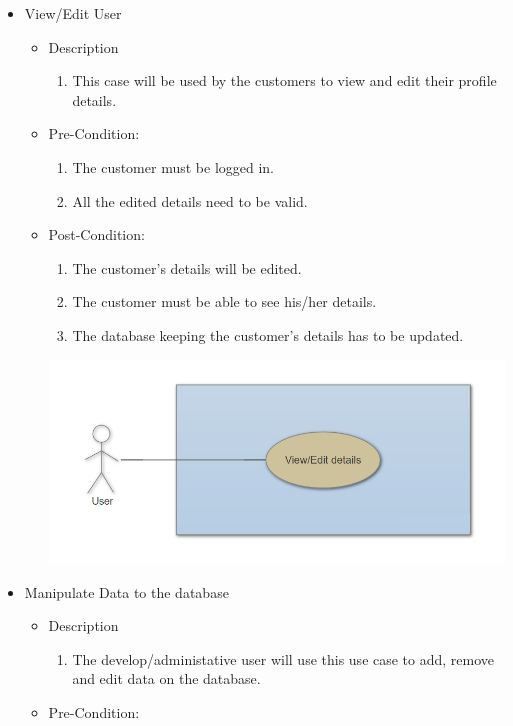 \documentclass[a4paper,10pt]{article}
\begin{document}
\begin{enumerate}
\begin{itemize}
				\item View/Edit User
				\begin{itemize}
					\item Description
						\begin{enumerate}
							\item This case will be used by the customers to view and edit their profile details.
						\end{enumerate}
					\item Pre-Condition:
						\begin{enumerate}	
							\item The customer must be logged in.
							\item All the edited details need to be valid.
						\end{enumerate}
					\item Post-Condition:
						\begin{enumerate}
							\item The customer's details will be edited.
							\item The customer must be able to see his/her details.
							\item The database keeping the customer's details has to be updated.
						\end{enumerate}
	 \includegraphics[scale=0.62]{Diagrams/View_EditUseCase.png}\\
				\end{itemize}
			\item Manipulate Data to the database
			\begin{itemize}
				\item Description
					\begin{enumerate}
						\item The develop/administative user will use this use case to add, remove and edit data on the database. 
					\end{enumerate}
				\item Pre-Condition:

\end{itemize}
\end{itemize}
\end{enumerate}
\end{document}
